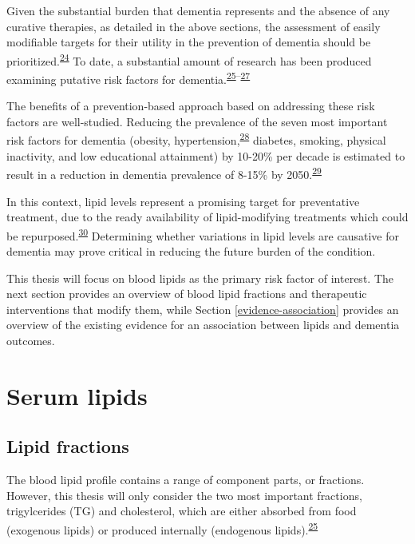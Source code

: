 \documentclass[a4paper, twoside]{templates/ociamthesis}
\begin{document}
Given the substantial burden that dementia represents and the absence of any curative therapies, as detailed in the above sections, the assessment of easily modifiable targets for their utility in the prevention of dementia should be prioritized.\textsuperscript{\protect\hyperlink{ref-winblad2016}{24}} To date, a substantial amount of research has been produced examining putative risk factors for dementia.\textsuperscript{\protect\hyperlink{ref-feingold2000}{25}--\protect\hyperlink{ref-anstey2019}{27}}

The benefits of a prevention-based approach based on addressing these risk factors are well-studied. Reducing the prevalence of the seven most important risk factors for dementia (obesity, hypertension,\textsuperscript{\protect\hyperlink{ref-hughes2020}{28}} diabetes, smoking, physical inactivity, and low educational attainment) by 10-20\% per decade is estimated to result in a reduction in dementia prevalence of 8-15\% by 2050.\textsuperscript{\protect\hyperlink{ref-norton2014potential}{29}}

In this context, lipid levels represent a promising target for preventative treatment, due to the ready availability of lipid-modifying treatments which could be repurposed.\textsuperscript{\protect\hyperlink{ref-pushpakom2019}{30}} Determining whether variations in lipid levels are causative for dementia may prove critical in reducing the future burden of the condition.

This thesis will focus on blood lipids as the primary risk factor of interest. The next section provides an overview of blood lipid fractions and therapeutic interventions that modify them, while Section \ref{evidence-association} provides an overview of the existing evidence for an association between lipids and dementia outcomes.

\hypertarget{serum-lipids}{%
\section{Serum lipids}\label{serum-lipids}}

\hypertarget{intro-lipid-fractions}{%
\subsection{Lipid fractions}\label{intro-lipid-fractions}}

The blood lipid profile contains a range of component parts, or fractions. However, this thesis will only consider the two most important fractions, trigylcerides (TG) and cholesterol, which are either absorbed from food (exogenous lipids) or produced internally (endogenous lipids).\textsuperscript{\protect\hyperlink{ref-feingold2000}{25}}
\end{document}
